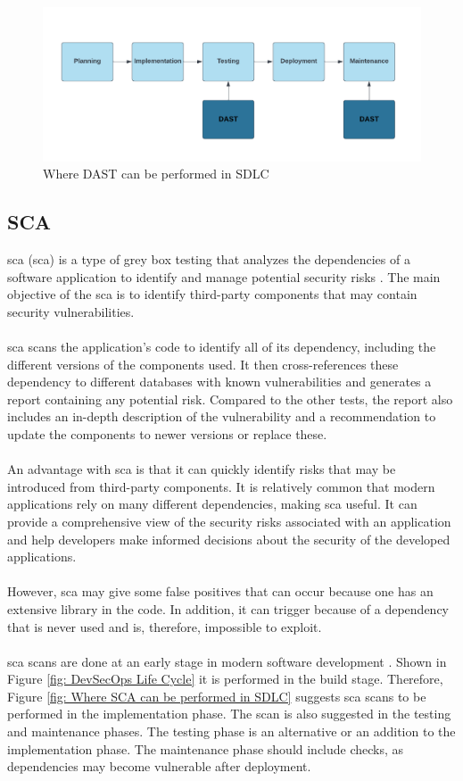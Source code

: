 \vspace{2mm}
\begin{figure}[H]
    \centering
    \includegraphics[width=0.8\columnwidth]{Images/dast.png}
    \caption{Where DAST can be performed in SDLC} 
    \label{fig: Where DAST can be performed in SDLC}
\end{figure}

\subsection{SCA}
\acrlong{sca} (\acrshort{sca}) is a type of grey box testing that analyzes the dependencies of a software application to identify and manage potential security risks \cite{sca}. The main objective of the \acrshort{sca} is to identify third-party components that may contain security vulnerabilities. 
\\~\\
\acrshort{sca} scans the application's code to identify all of its \gls{dependency}, including the different versions of the components used. It then cross-references these \gls{dependency} to different databases with known vulnerabilities and generates a report containing any potential risk. Compared to the other tests, the report also includes an in-depth description of the vulnerability and a recommendation to update the components to newer versions or replace these. 
\\~\\
An advantage with \acrshort{sca} is that it can quickly identify risks that may be introduced from third-party components. It is relatively common that modern applications rely on many different dependencies, making \acrshort{sca} useful. It can provide a comprehensive view of the security risks associated with an application and help developers make informed decisions about the security of the developed applications. 
\\~\\
However, \acrshort{sca} may give some false positives that can occur because one has an extensive library in the code. In addition, it can trigger because of a dependency that is never used and is, therefore, impossible to exploit.
\\~\\
\acrshort{sca} scans are done at an early stage in modern software development \cite{scaplasment}. Shown in Figure \ref{fig: DevSecOps Life Cycle} it is performed in the build stage. Therefore, Figure \ref{fig: Where SCA can be performed in SDLC} suggests \acrshort{sca} scans to be performed in the implementation phase. The scan is also suggested in the testing and maintenance phases. The testing phase is an alternative or an addition to the implementation phase. The maintenance phase should include checks, as dependencies may become vulnerable after deployment.

